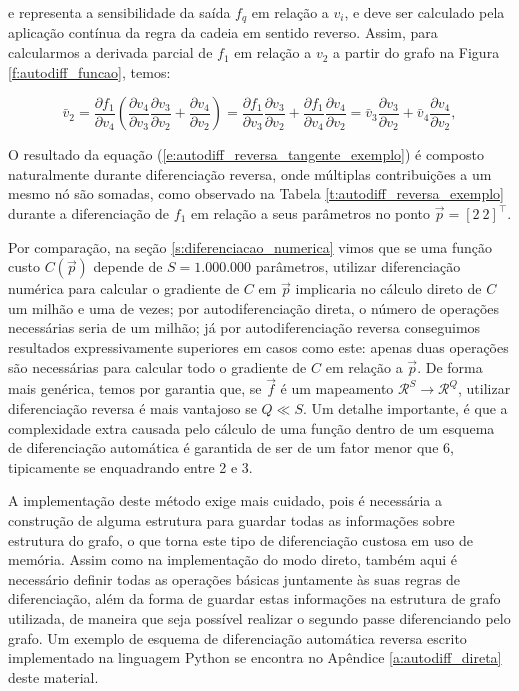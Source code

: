       \noindent e representa a sensibilidade da saída $f_q$ em relação a $v_i$, e deve ser calculado pela aplicação contínua da regra da cadeia em sentido reverso. Assim, para calcularmos a derivada parcial de $f_1$ em relação a $v_2$ a partir do grafo na Figura \ref{f:autodiff_funcao}, temos:

      \begin{equation} \label{e:autodiff_reversa_tangente_exemplo}
        \bar{v}_2
        =
        \frac{\partial f_1}{\partial v_4} \left(
          \frac{\partial v_4}{\partial v_3} \frac{\partial v_3}{\partial v_2} +
          \frac{\partial v_4}{\partial v_2}
        \right)
        =
        \frac{\partial f_1}{\partial v_3} \frac{\partial v_3}{\partial v_2} +
        \frac{\partial f_1}{\partial v_4} \frac{\partial v_4}{\partial v_2}
        =
        \bar{v}_3 \frac{\partial v_3}{\partial v_2} +
        \bar{v}_4 \frac{\partial v_4}{\partial v_2}
        ,
      \end{equation}

      O resultado da equação (\ref{e:autodiff_reversa_tangente_exemplo}) é composto naturalmente durante diferenciação reversa, onde múltiplas contribuições a um mesmo nó são somadas, como observado na Tabela \ref{t:autodiff_reversa_exemplo} durante a diferenciação de $f_1$ em relação a seus parâmetros no ponto $\vec{p} = [2\ 2]^\top$.

      Por comparação, na seção \ref{s:diferenciacao_numerica} vimos que se uma função custo $C(\vec{p})$ depende de $S=1.000.000$ parâmetros, utilizar diferenciação numérica para calcular o gradiente de $C$ em $\vec{p}$ implicaria no cálculo direto de $C$ um milhão e uma de vezes; por autodiferenciação direta, o número de operações necessárias seria de um milhão; já por autodiferenciação reversa conseguimos resultados expressivamente superiores em casos como este: apenas duas operações são necessárias para calcular todo o gradiente de $C$ em relação a $\vec{p}$. De forma mais genérica, temos por garantia que, se $\vec{f}$ é um mapeamento $\mathcal{R}^S \longrightarrow \mathcal{R}^Q$, utilizar diferenciação reversa é mais vantajoso se $Q\ll S$. Um detalhe importante, é que a complexidade extra causada pelo cálculo de uma função dentro de um esquema de diferenciação automática é garantida de ser de um fator menor que 6, tipicamente se enquadrando entre 2 e 3.

      A implementação deste método exige mais cuidado, pois é necessária a construção de alguma estrutura para guardar todas as informações sobre estrutura do grafo, o que torna este tipo de diferenciação custosa em uso de memória. Assim como na implementação do modo direto, também aqui é necessário definir todas as operações básicas juntamente às suas regras de diferenciação, além da forma de guardar estas informações na estrutura de grafo utilizada, de maneira que seja possível realizar o segundo passe diferenciando pelo grafo. Um exemplo de esquema de diferenciação automática reversa escrito implementado na linguagem Python se encontra no Apêndice \ref{a:autodiff_direta} deste material.

